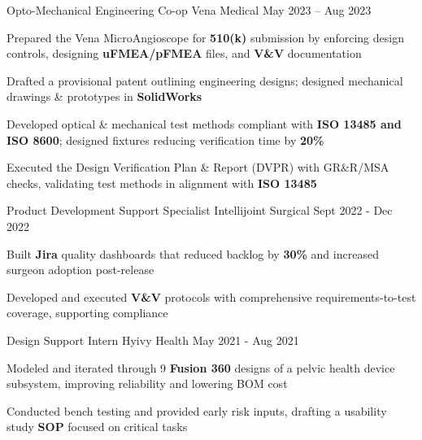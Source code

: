 \documentclass[11pt, a4paper]{russell}
\begin{document}
\begin{cventries}
\cventry
  {Opto-Mechanical Engineering Co-op} %
  {Vena Medical} %
  {} %
  {May 2023 -- Aug 2023} %
  {
    \begin{cvitems}
        \item {Prepared the Vena MicroAngioscope for \textbf{510(k)} submission by enforcing design controls, designing \textbf{uFMEA/pFMEA} files, and \textbf{V\&V} documentation}
        \item {Drafted a provisional patent outlining engineering designs; designed mechanical drawings \& prototypes in \textbf{SolidWorks}}
        \item {Developed optical \& mechanical test methods compliant with \textbf{ISO 13485 and ISO 8600}; designed fixtures reducing verification time by \textbf{20\%}}
        \item {Executed the Design Verification Plan \& Report (DVPR) with GR\&R/MSA checks, validating test methods in alignment with \textbf{ISO 13485}}
    \end{cvitems}
  }

\cventry
  {Product Development Support Specialist} %
  {Intellijoint Surgical} %
  {} %
  {Sept 2022 - Dec 2022} %
  {
    \begin{cvitems}
        \item {Built \textbf{Jira} quality dashboards that reduced backlog by \textbf{30\%} and increased surgeon adoption post-release}
        \item {Developed and executed \textbf{V\&V} protocols with comprehensive requirements-to-test coverage, supporting compliance}
    \end{cvitems}
  }

\cventry
  {Design Support Intern} %
  {Hyivy Health} %
  {} %
  {May 2021 - Aug 2021} %
  {
    \begin{cvitems}
        \item {Modeled and iterated through 9 \textbf{Fusion 360} designs of a pelvic health device subsystem, improving reliability and lowering BOM cost}
        \item {Conducted bench testing and provided early risk inputs, drafting a usability study \textbf{SOP} focused on critical tasks}
    \end{cvitems}
  }
\end{cventries}
\end{document}
